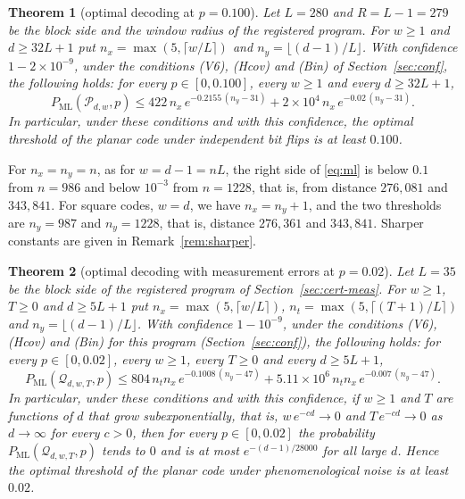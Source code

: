 \documentclass[11pt]{amsart}
\newtheorem{theorem}{Theorem}[section]
\theoremstyle{definition}
\theoremstyle{remark}
\numberwithin{equation}{section}
\newcommand{\PML}{P_{\mathrm{ML}}}
\begin{document}
\begin{theorem}[optimal decoding at $p=0.100$]\label{thm:ml}
Let $L=280$ and $R=L-1=279$ be the block side and the window radius of the registered program. For $w\ge1$ and $d\ge 32L+1$ put $n_x=\max(5,\lceil w/L\rceil)$ and $n_y=\lfloor (d-1)/L\rfloor$. With confidence $1-2\times10^{-9}$, under the conditions \textup{(V6)}, \textup{(Hcov)} and \textup{(Bin)} of Section~\ref{sec:conf}, the following holds: for every $p\in[0,0.100]$, every $w\ge1$ and every $d\ge32L+1$,
\begin{equation}\label{eq:ml}
\PML(\mathcal P_{d,w},p)\le 422\,n_x\,e^{-0.2155\,(n_y-31)}+2\times10^{4}\,n_x\,e^{-0.02\,(n_y-31)} .
\end{equation}
In particular, under these conditions and with this confidence, the optimal threshold of the planar code under independent bit flips is at least $0.100$.
\end{theorem}

For $n_x=n_y=n$, as for $w=d-1=nL$, the right side of \eqref{eq:ml} is below $0.1$ from $n=986$ and below $10^{-3}$ from $n=1228$, that is, from distance $276{,}081$ and $343{,}841$. For square codes, $w=d$, we have $n_x=n_y+1$, and the two thresholds are $n_y=987$ and $n_y=1228$, that is, distance $276{,}361$ and $343{,}841$. Sharper constants are given in Remark~\ref{rem:sharper}.

\begin{theorem}[optimal decoding with measurement errors at $p=0.02$]\label{thm:d1}
Let $L=35$ be the block side of the registered program of Section~\ref{sec:cert-meas}. For $w\ge1$, $T\ge0$ and $d\ge5L+1$ put $n_x=\max(5,\lceil w/L\rceil)$, $n_t=\max(5,\lceil (T+1)/L\rceil)$ and $n_y=\lfloor (d-1)/L\rfloor$. With confidence $1-10^{-9}$, under the conditions \textup{(V6)}, \textup{(Hcov)} and \textup{(Bin)} for this program (Section~\ref{sec:conf}), the following holds: for every $p\in[0,0.02]$, every $w\ge1$, every $T\ge0$ and every $d\ge5L+1$,
\begin{equation}\label{eq:d1}
\PML(\mathcal Q_{d,w,T},p)\le 804\,n_tn_x\,e^{-0.1008\,(n_y-47)}+5.11\times10^{6}\,n_tn_x\,e^{-0.007\,(n_y-47)} .
\end{equation}
In particular, under these conditions and with this confidence, if $w\ge1$ and $T$ are functions of $d$ that grow subexponentially, that is, $w\,e^{-cd}\to0$ and $T\,e^{-cd}\to0$ as $d\to\infty$ for every $c>0$, then for every $p\in[0,0.02]$ the probability $\PML(\mathcal Q_{d,w,T},p)$ tends to $0$ and is at most $e^{-(d-1)/28000}$ for all large $d$. Hence the optimal threshold of the planar code under phenomenological noise is at least $0.02$.
\end{theorem}
\end{document}
